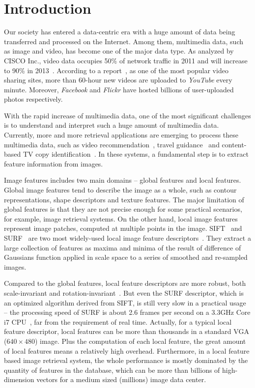 \section{Introduction}
\label{sec:introduction}

Our society has entered a data-centric era with a huge amount of data being transferred and processed on the Internet. Among them, multimedia data, such as image and video, has become one of the major data type. As analyzed by CISCO Inc., video data occupies 50\% of network traffic in 2011 and will increase to 90\% in 2013~\cite{index2010forecast}.  According to a report~\cite{jansohn2009detecting}, as one of the most popular video sharing sites, more than 60-hour new videos are uploaded to \emph{YouTube} every minute. Moreover, \emph{Facebook} and \emph{Flickr} have hosted billions of user-uploaded photos respectively.

With the rapid increase of multimedia data, one of the most significant challenges is to understand and interpret such a huge amount of multimedia data. Currently, more and more retrieval applications are emerging to process these multimedia data, such as video recommendation~\cite{videorecommendation2007}, travel guidance~\cite{travelguidance2010} and content-based TV copy identification~\cite{tvidentify2003}. In these systems, a fundamental step is to extract feature information from images. 

Image features includes two main domains -- global features and local features. Global image features tend to describe the image as a whole, such as contour representations, shape descriptors and texture features. The major limitation of global features is that they are not precise enough for some practical scenarios, for example, image retrieval systems. On the other hand, local image features represent image patches, computed at multiple points in the image. SIFT~\cite{Lowe2004SIFT,RobHess} and SURF~\cite{Bay2006SURF,Evans20009OpenSURF} are two most widely-used local image feature descriptors~\cite{Mikolajczyk2005Evaluation}\cite{Bauer2007Evaluation}. They extract a large collection of features as maxima and minima of the result of difference of Gaussians function applied in scale space to a series of smoothed and re-sampled images.

Compared to the global features, local feature descriptors are more robust, both scale-invariant and rotation-invariant~\cite{mikolajczyk2005performance}\cite{Bauer2007Evaluation}. But even the SURF descriptor, which is an optimized algorithm derived from SIFT, is still very slow in a practical usage -- the processing speed of SURF is about 2.6 frames per second on a 3.3GHz Core i7 CPU~\cite{Fang2011ispass}, far from the requirement of real time. Actually, for a typical local feature descriptor, local features can be more than thousands in a standard VGA ($640\times480$) image. Plus the computation of each local feature, the great amount of local features means a relatively high overhead. Furthermore, in a local feature based image retrieval system, the whole performance is mostly dominated by the quantity of features in the database, which can be more than billions of high-dimension vectors for a medium sized (millions) image data center.

